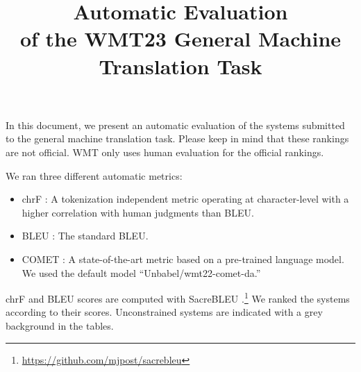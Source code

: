 \documentclass[11pt]{article}
\title{Automatic Evaluation\\ of the WMT23 General Machine Translation Task}
\begin{document}
\maketitle

In this document, we present an automatic evaluation of the systems submitted to the general machine translation task. Please keep in mind that these rankings are not official. WMT only uses human evaluation for the official rankings.


We ran three different automatic metrics:
\begin{itemize}
\item chrF \citep{popovic-2015-chrf}: A tokenization independent metric operating at character-level with a higher correlation with human judgments than BLEU.
\item BLEU \citep{papineni-etal-2002-bleu}: The standard BLEU. 
\item COMET \citep{rei-etal-2020-comet}: A state-of-the-art metric based on a pre-trained language model. We used the default model ``Unbabel/wmt22-comet-da.''
\end{itemize}


chrF and BLEU scores are computed with SacreBLEU \citep{post-2018-call}.\footnote{\url{https://github.com/mjpost/sacrebleu}} We ranked the systems according to their scores. Unconstrained systems are indicated with a grey background in the tables.
\end{document}
